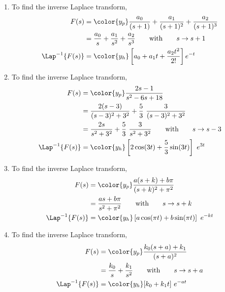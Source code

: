 \begin{enumerate}
    \item To find the inverse Laplace transform,
          \begin{align}
              F(s)              & = \color{y_p} \frac{a_0}{(s+1)}
              + \frac{a_1}{(s+1)^2} + \frac{a_2}{(s+1)^3}           \\
                                & = \frac{a_0}{s} + \frac{a_1}{s^2}
              + \frac{a_2}{s^3} \qquad \text{with} \qquad s \to s+1 \\
              \Lap^{-1}\{F(s)\} & =  \color{y_h} \left[
                  a_0 + a_1t + \frac{a_2t^2}{2!}  \right]e^{-t}
          \end{align}

    \item To find the inverse Laplace transform,
          \begin{align}
              F(s)              & = \color{y_p} \frac{2s-1}
              {s^2 - 6s + 18}                                    \\
                                & = \frac{2(s-3)}{(s-3)^2 + 3^2}
              + \frac{5}{3}\ \frac{3}{(s-3)^2 + 3^2}             \\
                                & = \frac{2s}{s^2 + 3^2}
              + \frac{5}{3}\ \frac{3}{s^2 + 3^2}
              \qquad \text{with} \qquad s \to s-3                \\
              \Lap^{-1}\{F(s)\} & =  \color{y_h} \left[2\cos(3t)
                  + \frac{5}{3}\sin(3t)\right]\ e^{3t}
          \end{align}

    \item To find the inverse Laplace transform,
          \begin{align}
              F(s)              & = \color{y_p} \frac{a(s+k) + b\pi}
              {(s+k)^2 + \pi^2}                                      \\
                                & = \frac{as + b\pi}{s^2 + \pi^2}
              \qquad \text{with} \qquad s \to s+k                    \\
              \Lap^{-1}\{F(s)\} & =  \color{y_h} \left[a\cos(\pi t)
                  + b\sin(\pi t)\right]\ e^{-kt}
          \end{align}


    \item To find the inverse Laplace transform,
          \begin{align}
              F(s)              & = \color{y_p} \frac{k_0(s+a) + k_1}
              {(s+a)^2}                                                 \\
                                & = \frac{k_0}{s} + \frac{k_1}{s^2}
              \qquad \text{with} \qquad s \to s+a                       \\
              \Lap^{-1}\{F(s)\} & =  \color{y_h} [k_0 + k_1 t]\ e^{-at}
          \end{align}
\end{enumerate}
